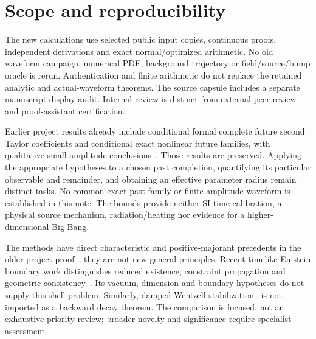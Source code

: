 \documentclass[11pt]{article}
\begin{document}
\section*{Scope and reproducibility}
The new calculations use selected public input copies, continuous proofs,
independent derivations and exact normal/optimized arithmetic. No old waveform
campaign, numerical PDE, background trajectory or field/source/bump oracle
is rerun. Authentication and finite arithmetic do not replace the retained
analytic and actual-waveform theorems. The source capsule includes a separate
manuscript display audit. Internal review is distinct from external peer
review and proof-assistant certification.

Earlier project results already include conditional formal complete future
second Taylor coefficients and conditional exact nonlinear future families,
with qualitative small-amplitude conclusions~\cite{second,nonlinear,intrinsic}.
Those results are preserved. Applying the appropriate hypotheses to a chosen
past completion, quantifying its particular observable and remainder, and
obtaining an effective parameter radius remain distinct tasks. No common
exact past family or finite-amplitude waveform is established in this note.
The bounds provide neither SI time calibration, a physical source mechanism,
radiation/heating nor evidence for a higher-dimensional Big Bang.

The methods have direct characteristic and positive-majorant precedents in
the older project proof~\cite{inertial}; they are not new general principles.
Recent timelike-Einstein boundary work distinguishes reduced existence,
constraint propagation and geometric consistency~\cite{stevens}. Its vacuum,
dimension and boundary hypotheses do not supply this shell problem.
Similarly, damped Wentzell stabilization~\cite{parada} is not imported as a
backward decay theorem. The comparison is focused, not an exhaustive
priority review; broader novelty and significance require specialist assessment.
\end{document}
